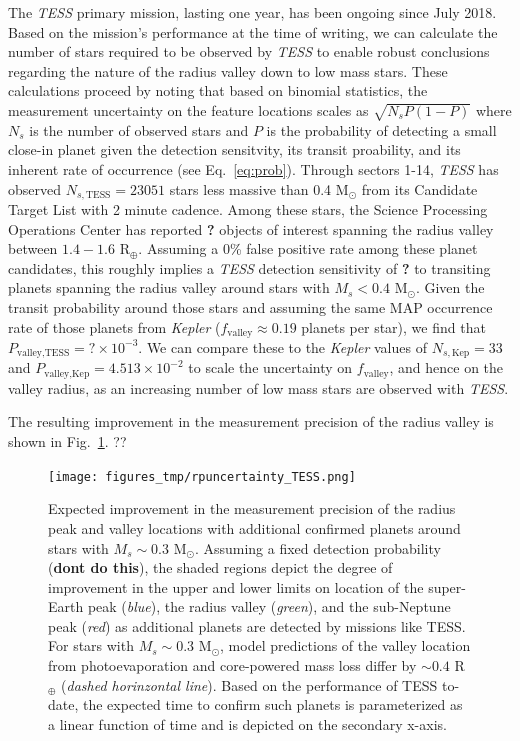 \documentclass[twocolumn]{emulateapj}
\newcommand{\kepler}[1]{\emph{Kepler}#1}
\newcommand{\tess}[1]{\emph{TESS}#1}
\begin{document}
The \tess{} primary mission, lasting one year, has been ongoing since July 2018. 
Based on the mission's performance at the time of writing, we can calculate the number of stars required to be observed
by \tess{} to enable robust conclusions regarding the nature of the radius valley down to low mass stars. These calculations
proceed by noting that based on binomial statistics, the measurement uncertainty on the feature locations scales as
$\sqrt{N_sP(1-P)}$ where $N_s$ is the number of observed stars and $P$ is the probability of detecting a small close-in planet
given the detection sensitvity, its transit proability, and its inherent rate of occurrence (see Eq.~\ref{eq:prob}).
Through sectors 1-14, \tess{} has observed $N_{s,\text{TESS}} = 23051$ stars less massive than 0.4 M$_{\odot}$
from its Candidate Target List \citep[CTL;][]{stassun19} with 2 minute cadence.
Among these stars, the Science Processing Operations Center \citep[SPOC;][]{jenkins16,twicken18,li18} has reported
\textbf{?} objects of interest spanning the radius valley between $1.4-1.6$ R$_{\oplus}$. Assuming a 0\% false positive rate
among these planet candidates, this roughly implies a \tess{} detection sensitivity
of \textbf{?} to transiting planets spanning the
radius valley around stars with $M_s< 0.4$ M$_{\odot}$. Given the transit probability around those stars and assuming the
same MAP occurrence rate of those planets from \kepler{} ($f_{\text{valley}}\approx 0.19$ planets per star), we find that
$P_{\text{valley,TESS}}=\mathbf{?} \times 10^{-3}$. We can compare these to the \kepler{} values of $N_{s,\text{Kep}}=33$ and
$P_{\text{valley,Kep}}=4.513\times 10^{-2}$ to scale the uncertainty on $f_{\text{valley}}$, and hence on the valley radius, 
as an increasing number of low mass stars are observed with \tess{.}

The resulting improvement in the measurement precision of the radius valley is shown in Fig.~\ref{fig:improve}. ??


\begin{figure}
  \centering
  \texttt{[image: figures\_tmp/rpuncertainty\_TESS.png]}
  \caption{Expected improvement in the measurement precision of the radius peak and valley locations with additional
    confirmed planets around stars with $M_s\sim 0.3$ M$_{\odot}$. Assuming a fixed detection probability (\textbf{dont do this}),
    the shaded
    regions depict the degree of improvement in the upper and lower limits on location of the super-Earth peak
    (\emph{blue}), the radius valley (\emph{green}), and the sub-Neptune peak (\emph{red}) as additional planets are
    detected by missions like TESS. For stars with $M_s\sim 0.3$ M$_{\odot}$, model predictions of the valley location
    from photoevaporation and core-powered mass loss differ by $\sim 0.4$ R$_{\oplus}$ (\emph{dashed horinzontal line}).
    Based on the performance of TESS to-date, the expected time to confirm such planets is parameterized as a linear
    function of time and is depicted on the secondary x-axis.}
  \label{fig:improve}
\end{figure}
\end{document}
